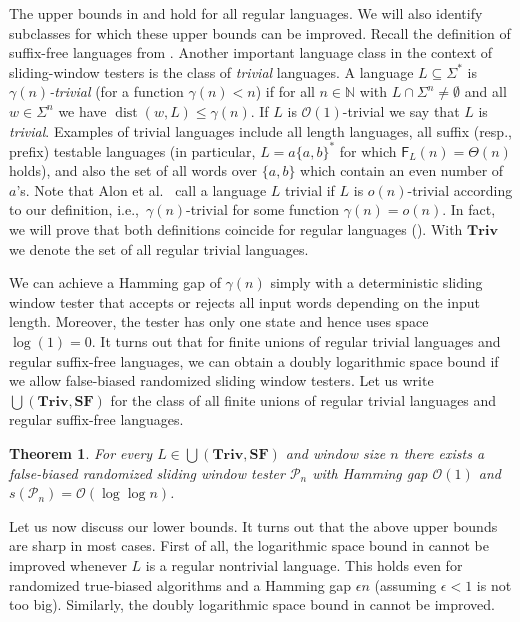 \documentclass{article}\usepackage[a4paper,margin=20mm]{geometry}
\newtheorem{theorem}{Theorem}\newtheorem{lemma}[theorem]{Lemma}\newtheorem{proposition}[theorem]{Proposition}\newtheorem{corollary}[theorem]{Corollary}\newtheorem{definition}[theorem]{Definition}\newtheorem{claim}[theorem]{Claim}\newtheorem{remark}[theorem]{Remark}\newtheorem{observation}[theorem]{Observation}\newtheorem{conjecture}[theorem]{Conjecture}\newtheorem{example}[theorem]{Example}
\newcommand{\N}{\mathbb{N}}
\renewcommand{\O}{\mathcal{O}}
\renewcommand{\P}{\mathcal{P}}
\newcommand{\F}{\mathsf{F}}
\DeclareMathOperator{\dist}{dist}
\newcommand{\Triv}{\mathbf{Triv}}
\newcommand{\SF}{\mathbf{SF}}
\renewcommand{\leq}{\leqslant}
\renewcommand{\le}{\leq}
\begin{document}
The upper bounds in  and  hold for all regular languages.
We will also identify subclasses for which these upper bounds can be improved. Recall the definition of suffix-free languages from 
. Another important language class in the context of sliding-window testers is the class of {\em trivial} languages.
A language $L \subseteq \Sigma^*$ is {\em $\gamma(n)$-trivial} (for a function $\gamma(n)<n$)
if for all $n \in \N$ with $L \cap \Sigma^n \neq \emptyset$
and all $w \in \Sigma^n$ we have $\dist(w,L) \le \gamma(n)$.
If $L$ is $\O(1)$-trivial we say that $L$ is {\em trivial}. 
Examples of trivial languages include all length languages, all suffix (resp., prefix) testable languages (in particular, $L = a \{a,b\}^*$ for which 
$\F_L(n) = \Theta(n)$ holds),
and also the set  of all words over $\{a,b\}$ which contain an even number of $a$'s. 
Note that Alon et al.~\cite{AlonKNS00} call a language $L$ trivial
if $L$ is $o(n)$-trivial according to our definition,
i.e.,~$\gamma(n)$-trivial for some function $\gamma(n) = o(n)$.
In fact, we will prove that both definitions coincide for regular languages ().
With $\Triv$ we denote the set of all  regular trivial languages.

We can achieve a Hamming gap of $\gamma(n)$ simply with a deterministic sliding window tester that accepts or rejects all input words depending on the input length.
Moreover, the tester has only one state and hence
uses space $\log(1) = 0$. It turns out that
for finite unions of regular trivial languages and regular suffix-free languages, we can obtain a doubly logarithmic space
 bound if we allow false-biased randomized sliding window testers. Let us write $\bigcup(\Triv, \SF)$ for the class
 of all finite unions of regular trivial languages and regular suffix-free languages.
 
 
\begin{theorem}
	\label{thm:false-biased}
	For every $L \in \bigcup(\Triv, \SF)$ and window size $n$ there exists a false-biased randomized sliding window tester $\P_n$
	with Hamming gap $\O(1)$ and $s(\P_n) = \O(\log \log n)$.
\end{theorem}


Let us now discuss our lower bounds. It turns out that the above upper bounds are sharp in most cases.
First of all, the logarithmic space bound in  cannot be improved
whenever $L$ is a regular nontrivial language. This holds even for randomized true-biased algorithms and a Hamming gap $\epsilon n$ (assuming $\epsilon<1$ is not too big).
Similarly, the doubly logarithmic space bound in  cannot be improved.
\end{document}
